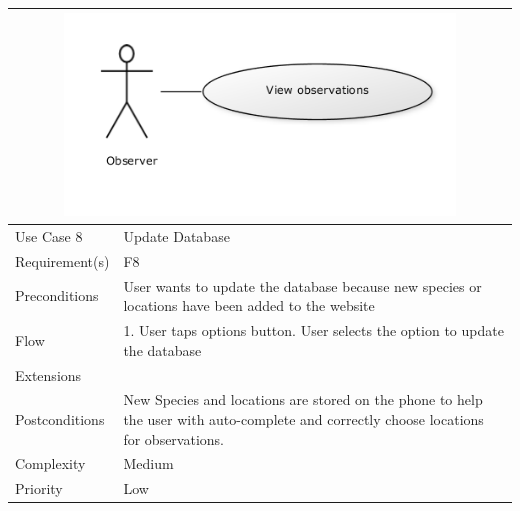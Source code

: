 \begin{tabular}[t]{|l|p{}|}
	\multicolumn{2}{c}{\includegraphics[width=0.8\textwidth]{reqspec/uc/viewobs.png}}\\\hline
	Use Case 8&Update Database\\\hline
	Requirement(s)&F8\\\hline
	Preconditions&User wants to update the database because new species or
	locations have been added to the website\\\hline
	Flow&1. User taps options button\newline
	2. User selects the option to update the database\\\hline
	Extensions& \\\hline
	Postconditions&New Species and locations are stored on the phone to help
	the user with auto-complete and correctly choose locations for observations.\\\hline
	Complexity&Medium\\\hline
	Priority&Low\\\hline
\end{tabular}
